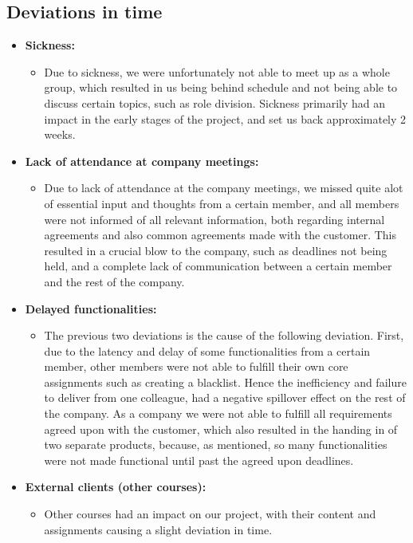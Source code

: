 \documentclass{article}
\begin{document}
\subsection*{Deviations in time}
\begin{itemize}
    \item \textbf{Sickness:}
        \begin{itemize}
            \item Due to sickness, we were unfortunately not able to meet up as a whole group, which resulted in us being behind schedule and not being able to discuss certain topics, such as role division. Sickness primarily had an impact in the early stages of the project, and set us back approximately 2 weeks.
        \end{itemize}
    \item \textbf{Lack of attendance at company meetings:}
    \begin{itemize}
        \item Due to lack of attendance at the company meetings, we missed 
        quite alot of essential input and thoughts from a certain member, and all members were not informed of all relevant information, both regarding internal agreements and also common agreements made with the customer. This resulted in a crucial blow to the company, such as deadlines not being held, and a complete lack of communication between a certain member and the rest of the company. 
    \end{itemize}
    
    \item  \textbf{Delayed functionalities:}
    \begin{itemize}
        \item The previous two deviations is the cause of the following deviation. First, due to the latency and delay of some functionalities from a certain member, other members were not able to fulfill their own core assignments such as creating a blacklist. Hence the inefficiency and failure to deliver from one colleague, had a negative spillover effect on the rest of the company. As a company we were not able to fulfill all requirements agreed upon with the customer, which also resulted in the handing in of two separate products, because, as mentioned, so many functionalities were not made functional until past the agreed upon deadlines.
    \end{itemize}
    \item \textbf{External clients (other courses):}
\begin{itemize}
    \item Other courses had an impact on our project, with their content and assignments causing a slight deviation in time. 
\end{itemize}
\end{itemize}
\end{document}
